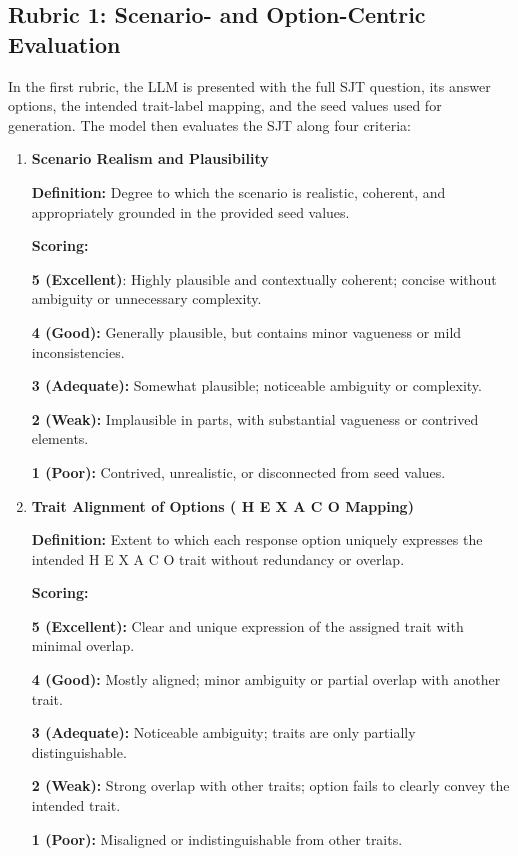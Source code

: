 \documentclass[11pt]{article}
\newcommand{\hexaco}{%
  {\textcolor{hexH}{H}}%
  {\textcolor{hexE}{E}}%
  {\textcolor{hexX}{X}}%
  {\textcolor{hexA}{A}}%
  {\textcolor{hexC}{C}}%
  {\textcolor{hexO}{O}}%
}
\begin{document}
\subsection{Rubric 1: Scenario- and Option-Centric Evaluation}
In the first rubric, the LLM is presented with the full SJT question, its answer options, the intended trait-label mapping, and the seed values used for generation. The model then evaluates the SJT along four criteria:
\begin{enumerate}
    \item \textbf{Scenario Realism and Plausibility}
    
    \textbf{Definition:} Degree to which the scenario is realistic, coherent, and appropriately grounded in the provided seed values.
    
    \textbf{Scoring:}
    
       \textbf{5 (Excellent)}: Highly plausible and contextually coherent; concise without ambiguity or unnecessary complexity.
    
      \textbf{4 (Good):} Generally plausible, but contains minor vagueness or mild inconsistencies.
    
      \textbf{3 (Adequate):} Somewhat plausible; noticeable ambiguity or complexity.
    
     \textbf{2 (Weak):} Implausible in parts, with substantial vagueness or contrived elements.
    
     \textbf{1 (Poor):} Contrived, unrealistic, or disconnected from seed values.

    \item \textbf{Trait Alignment of Options (\hexaco\;  Mapping)}

    \textbf{Definition:} Extent to which each response option uniquely expresses the intended \hexaco\;  trait without redundancy or overlap.
    
    \textbf{Scoring:}
    
    \textbf{5 (Excellent):} Clear and unique expression of the assigned trait with minimal overlap.
    
    \textbf{4 (Good):} Mostly aligned; minor ambiguity or partial overlap with another trait.

    \textbf{3 (Adequate):} Noticeable ambiguity; traits are only partially distinguishable.

    \textbf{2 (Weak):} Strong overlap with other traits; option fails to clearly convey the intended trait.

    \textbf{1 (Poor):} Misaligned or indistinguishable from other traits.


\end{enumerate}
\end{document}
